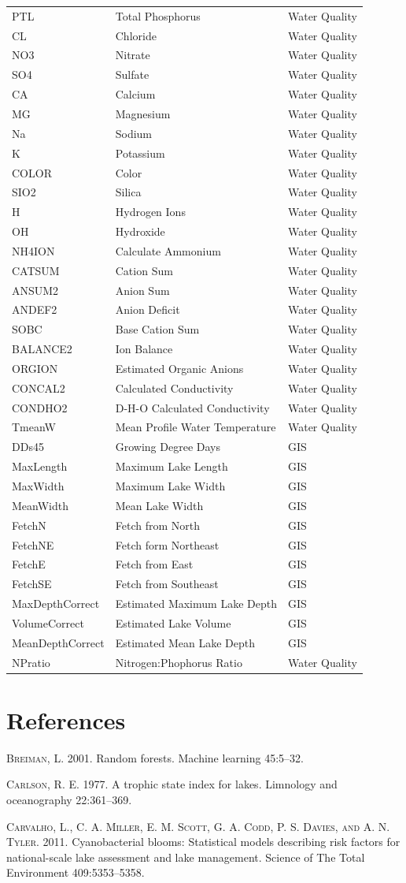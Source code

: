 \documentclass[11pt,]{article}
\begin{document}
\begin{longtable}[c]{@{}lll@{}}
PTL & Total Phosphorus & Water Quality\tabularnewline
CL & Chloride & Water Quality\tabularnewline
NO3 & Nitrate & Water Quality\tabularnewline
SO4 & Sulfate & Water Quality\tabularnewline
CA & Calcium & Water Quality\tabularnewline
MG & Magnesium & Water Quality\tabularnewline
Na & Sodium & Water Quality\tabularnewline
K & Potassium & Water Quality\tabularnewline
COLOR & Color & Water Quality\tabularnewline
SIO2 & Silica & Water Quality\tabularnewline
H & Hydrogen Ions & Water Quality\tabularnewline
OH & Hydroxide & Water Quality\tabularnewline
NH4ION & Calculate Ammonium & Water Quality\tabularnewline
CATSUM & Cation Sum & Water Quality\tabularnewline
ANSUM2 & Anion Sum & Water Quality\tabularnewline
ANDEF2 & Anion Deficit & Water Quality\tabularnewline
SOBC & Base Cation Sum & Water Quality\tabularnewline
BALANCE2 & Ion Balance & Water Quality\tabularnewline
ORGION & Estimated Organic Anions & Water Quality\tabularnewline
CONCAL2 & Calculated Conductivity & Water Quality\tabularnewline
CONDHO2 & D-H-O Calculated Conductivity & Water Quality\tabularnewline
TmeanW & Mean Profile Water Temperature & Water Quality\tabularnewline
DDs45 & Growing Degree Days & GIS\tabularnewline
MaxLength & Maximum Lake Length & GIS\tabularnewline
MaxWidth & Maximum Lake Width & GIS\tabularnewline
MeanWidth & Mean Lake Width & GIS\tabularnewline
FetchN & Fetch from North & GIS\tabularnewline
FetchNE & Fetch form Northeast & GIS\tabularnewline
FetchE & Fetch from East & GIS\tabularnewline
FetchSE & Fetch from Southeast & GIS\tabularnewline
MaxDepthCorrect & Estimated Maximum Lake Depth & GIS\tabularnewline
VolumeCorrect & Estimated Lake Volume & GIS\tabularnewline
MeanDepthCorrect & Estimated Mean Lake Depth & GIS\tabularnewline
NPratio & Nitrogen:Phophorus Ratio & Water Quality\tabularnewline
\bottomrule
\end{longtable}

\newpage

\section*{References}\label{references}

\textsc{Breiman, L.} 2001. Random forests. Machine learning 45:5--32.

\textsc{Carlson, R. E.} 1977. A trophic state index for lakes. Limnology
and oceanography 22:361--369.

\textsc{Carvalho, L., C. A. Miller, E. M. Scott, G. A. Codd, P. S.
Davies, and A. N. Tyler}. 2011. Cyanobacterial blooms: Statistical
models describing risk factors for national-scale lake assessment and
lake management. Science of The Total Environment 409:5353--5358.
\end{document}
